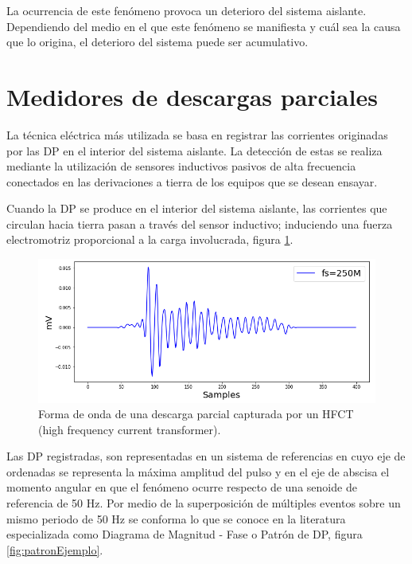 La ocurrencia de este fenómeno provoca un deterioro del sistema aislante. Dependiendo del medio en el que este fenómeno se manifiesta y cuál sea la causa que lo origina, el deterioro del sistema puede ser acumulativo.

\section{Medidores de descargas parciales}
La técnica eléctrica más utilizada se basa en registrar las corrientes originadas por las DP en el interior del sistema aislante. La detección de estas se realiza mediante la utilización de sensores inductivos pasivos de alta frecuencia conectados en las derivaciones a tierra de los equipos que se desean ensayar.

Cuando la DP se produce en el interior del sistema aislante, las corrientes que circulan hacia tierra pasan a través del sensor inductivo; induciendo una fuerza electromotriz proporcional a la carga involucrada, figura \ref{fig:dpEjemplo}.

\begin{figure}[ht]
	\centering
	\includegraphics[width=\textwidth]{./Figures/dpEjemplo.png}
	\caption{Forma de onda de una descarga parcial capturada por un HFCT (high frequency current transformer).}
	\label{fig:dpEjemplo}
\end{figure}

Las DP registradas, son representadas en un sistema de referencias en cuyo eje de ordenadas se representa la máxima amplitud del pulso y en el eje de abscisa el momento angular en que el fenómeno ocurre respecto de una senoide de referencia de 50 Hz. Por medio de la superposición de múltiples eventos sobre un mismo periodo de 50 Hz se conforma lo que se conoce en la literatura especializada como Diagrama de Magnitud - Fase o Patrón de DP, figura \ref{fig:patronEjemplo}.


